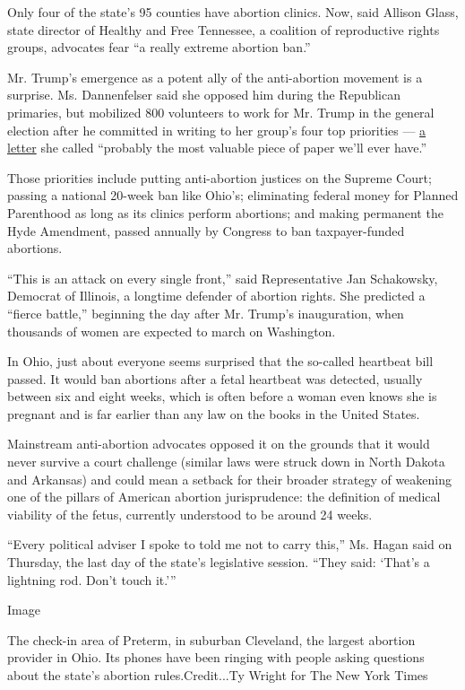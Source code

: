 Only four of the state's 95 counties have abortion clinics. Now, said
Allison Glass, state director of Healthy and Free Tennessee, a coalition
of reproductive rights groups, advocates fear ``a really extreme
abortion ban.''

Mr. Trump's emergence as a potent ally of the anti-abortion movement is
a surprise. Ms. Dannenfelser said she opposed him during the Republican
primaries, but mobilized 800 volunteers to work for Mr. Trump in the
general election after he committed in writing to her group's four top
priorities ---
\href{https://www.donaldjtrump.com/press-releases/trump-campaign-announces-national-co-chairs-of-pro-life-coalition}{a
letter} she called ``probably the most valuable piece of paper we'll
ever have.''

Those priorities include putting anti-abortion justices on the Supreme
Court; passing a national 20-week ban like Ohio's; eliminating federal
money for Planned Parenthood as long as its clinics perform abortions;
and making permanent the Hyde Amendment, passed annually by Congress to
ban taxpayer-funded abortions.

``This is an attack on every single front,'' said Representative Jan
Schakowsky, Democrat of Illinois, a longtime defender of abortion
rights. She predicted a ``fierce battle,'' beginning the day after Mr.
Trump's inauguration, when thousands of women are expected to march on
Washington.

In Ohio, just about everyone seems surprised that the so-called
heartbeat bill passed. It would ban abortions after a fetal heartbeat
was detected, usually between six and eight weeks, which is often before
a woman even knows she is pregnant and is far earlier than any law on
the books in the United States.

Mainstream anti-abortion advocates opposed it on the grounds that it
would never survive a court challenge (similar laws were struck down in
North Dakota and Arkansas) and could mean a setback for their broader
strategy of weakening one of the pillars of American abortion
jurisprudence: the definition of medical viability of the fetus,
currently understood to be around 24 weeks.

``Every political adviser I spoke to told me not to carry this,'' Ms.
Hagan said on Thursday, the last day of the state's legislative session.
``They said: `That's a lightning rod. Don't touch it.'''

Image

The check-in area of Preterm, in suburban Cleveland, the largest
abortion provider in Ohio. Its phones have been ringing with people
asking questions about the state's abortion rules.Credit...Ty Wright for
The New York Times

